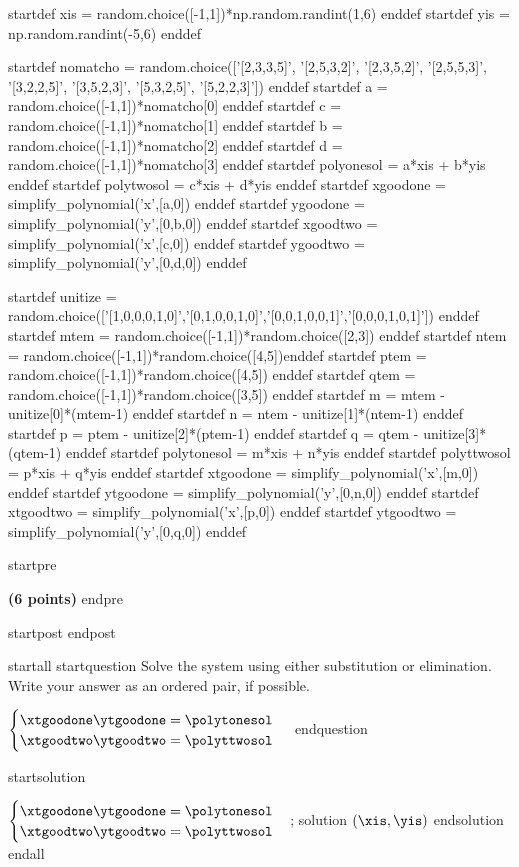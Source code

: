 
startdef xis = random.choice([-1,1])*np.random.randint(1,6) enddef
startdef yis = np.random.randint(-5,6) enddef

startdef nomatcho = random.choice(['[2,3,3,5]', '[2,5,3,2]', '[2,3,5,2]', '[2,5,5,3]', '[3,2,2,5]', '[3,5,2,3]', '[5,3,2,5]', '[5,2,2,3]']) enddef
startdef a = random.choice([-1,1])*nomatcho[0] enddef
startdef c = random.choice([-1,1])*nomatcho[1] enddef
startdef b = random.choice([-1,1])*nomatcho[2] enddef
startdef d = random.choice([-1,1])*nomatcho[3] enddef
startdef polyonesol = a*xis + b*yis enddef
startdef polytwosol = c*xis + d*yis enddef
startdef xgoodone = simplify_polynomial('x',[a,0]) enddef
startdef ygoodone = simplify_polynomial('y',[0,b,0]) enddef
startdef xgoodtwo = simplify_polynomial('x',[c,0]) enddef
startdef ygoodtwo = simplify_polynomial('y',[0,d,0]) enddef


startdef unitize = random.choice(['[1,0,0,0,1,0]','[0,1,0,0,1,0]','[0,0,1,0,0,1]','[0,0,0,1,0,1]']) enddef
startdef mtem = random.choice([-1,1])*random.choice([2,3]) enddef
startdef ntem = random.choice([-1,1])*random.choice([4,5])enddef
startdef ptem = random.choice([-1,1])*random.choice([4,5]) enddef
startdef qtem = random.choice([-1,1])*random.choice([3,5]) enddef
startdef m = mtem - unitize[0]*(mtem-1) enddef
startdef n = ntem - unitize[1]*(ntem-1) enddef
startdef p = ptem - unitize[2]*(ptem-1) enddef
startdef q = qtem - unitize[3]*(qtem-1) enddef
startdef polytonesol = m*xis + n*yis enddef
startdef polyttwosol = p*xis + q*yis enddef
startdef xtgoodone = simplify_polynomial('x',[m,0]) enddef
startdef ytgoodone = simplify_polynomial('y',[0,n,0]) enddef
startdef xtgoodtwo = simplify_polynomial('x',[p,0]) enddef
startdef ytgoodtwo = simplify_polynomial('y',[0,q,0]) enddef





startpre
\item {\bf (6 points)} 
endpre

startpost
 \vfill \vfill
endpost


startall
startquestion Solve the system using either substitution or elimination. Write your answer as an ordered pair, if possible. 

$ \begin{cases} \xtgoodone \ytgoodone = \polytonesol \\
\xtgoodtwo \ytgoodtwo = \polyttwosol
\end{cases}$
endquestion 

startsolution
\item $ \begin{cases} \xtgoodone \ytgoodone = \polytonesol \\
\xtgoodtwo \ytgoodtwo = \polyttwosol
\end{cases}$; solution $(\xis, \yis)$
endsolution
endall




